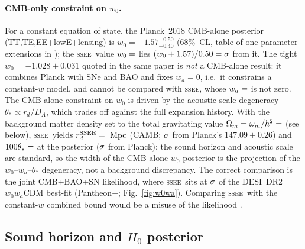 \documentclass[12pt,a4paper]{article}
\newcommand{\SSEE}{\ifmmode\mathrm{SSEE}\else\textsc{ssee}\fi}
\newcommand{\wa}{w_a}
\begin{document}
\paragraph{CMB-only constraint on $w_0$.}
For a constant equation of state, the Planck~2018 CMB-alone posterior
(TT,TE,EE+lowE+lensing) is $w_0=-1.57^{+0.50}_{-0.40}$ (68\%~CL, table of
one-parameter extensions in \citealt{Planck2018}); the \SSEE\ value
$w_0=\val{W0_d6}$ lies $(w_0+1.57)/0.50=\val{w0_cmb_solo_sig}\sigma$ from it.  The tight
$w_0=-1.028\pm0.031$ quoted in the same paper is \emph{not} a CMB-alone
result: it combines Planck with SNe and BAO and fixes $w_a=0$, i.e.\ it
constrains a constant-$w$ model, and cannot be compared with \SSEE, whose
$\wa=\val{WA_d6}$ is not zero.  The CMB-alone
constraint on $w_0$ is driven by the acoustic-scale degeneracy
$\theta_\ast \propto r_d/D_A$, which trades off against the full expansion
history.  With the background matter density set to the total gravitating
value $\Omega_m=\omega_m/h^2=\val{OMEGA_M_TOTAL_d6}$ (see below), \SSEE\ yields
$r_d^{}=\val{p2_lyaB_rd}\ \mathrm{Mpc}$ (CAMB; $\val{p3_rd_sig_post}\sigma$ from Planck's $147.09\pm0.26$)
and $100\theta_\ast=\val{p3_th100_post}$ at the posterior ($\val{p3_th_sig_post}\sigma$ from Planck): the sound horizon and
acoustic scale are standard, so the width of the CMB-alone $w_0$ posterior is the
projection of the $w_0$--$w_a$--$\theta_\ast$ degeneracy, not a background
discrepancy.  The correct comparison is the joint
CMB+BAO+SN likelihood, where \SSEE\ sits at $\val{p2_w0wa_ssee_ec26}\sigma$ of the DESI~DR2
$w_0w_a$CDM best-fit (Pantheon+; Fig.~\ref{fig:w0wa}).  Comparing \SSEE\ with the constant-$w$ combined bound would be a misuse of
the likelihood \citep{Verde2019}.

\subsection{Sound horizon and $H_0$ posterior}
\end{document}
